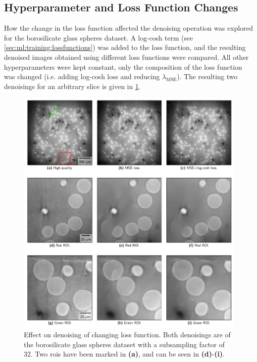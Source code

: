 \subsection{Hyperparameter and Loss Function Changes}
How the change in the loss function affected the denoising operation was explored for the borosilicate glass spheres dataset. A log-cosh term (see \cref{sec:ml:training:lossfunctions}) was added to the loss function, and the resulting denoised images obtained using different loss functions were compared. All other hyperparameters were kept constant, only the composition of the loss function was changed (i.e. adding log-cosh loss and reducing $\lambda_{\text{MSE}}$). The resulting two denoisings for an arbitrary slice is given in \cref{fig:losschangedenoisingcomparison}. 

\begin{figure}[htbp]
  \centering
  \includegraphics[width=.9\textwidth]{figures/losschangedenoisingcomparison.pdf}
  \caption[Effect on denoising of changing the loss function]{Effect on denoising of changing loss function. Both denoisings are of the borosilicate glass spheres dataset with a subsampling factor of 32. Two \gls{roi}s have been marked in \textbf{(a)}, and can be seen in \textbf{(d)}-\textbf{(i)}. }
  \label{fig:losschangedenoisingcomparison}
\end{figure}


